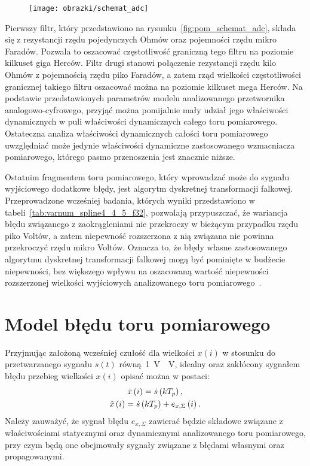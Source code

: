 \begin{figure}[htb!]
\begin{center}
\texttt{[image: obrazki/schemat\_adc]}
\end{center}
\end{figure}

Pierwszy filtr, który przedstawiono na rysunku~\ref{fig:pom_schemat_adc}, składa się z rezystancji rzędu pojedynczych Ohmów oraz pojemności rzędu mikro Faradów. Pozwala to oszacować częstotliwość graniczną tego filtru na poziomie kilkuset giga Herców. Filtr drugi stanowi połączenie rezystancji rzędu kilo Ohmów z pojemnością rzędu piko Faradów, a zatem rząd wielkości częstotliwości granicznej takiego filtru oszacować można na poziomie kilkuset mega Herców. Na podstawie przedstawionych parametrów modelu analizowanego przetwornika analogowo-cyfrowego, przyjąć można pomijalnie mały udział jego właściwości dynamicznych w puli właściwości dynamicznych całego toru pomiarowego. Ostateczna analiza właściwości dynamicznych całości toru pomiarowego uwzględniać może jedynie właściwości dynamiczne zastosowanego wzmacniacza pomiarowego, którego pasmo przenoszenia jest znacznie niższe.

Ostatnim fragmentem toru pomiarowego, który wprowadzać może do sygnału wyjściowego dodatkowe błędy, jest algorytm dyskretnej transformacji falkowej. Przeprowadzone wcześniej badania, których wyniki przedstawiono w tabeli~\ref{tab:varnum_spline4_4_5_f32}, pozwalają przypuszczać, że wariancja błędu związanego z zaokrągleniami nie przekroczy w bieżącym przypadku rzędu piko Voltów, a zatem niepewność rozszerzona z nią związana nie powinna przekroczyć rzędu mikro Voltów. Oznacza to, że błędy własne zastosowanego algorytmu dyskretnej transformacji falkowej mogą być pominięte w budżecie niepewności, bez większego wpływu na oszacowaną wartość niepewności rozszerzonej wielkości wyjściowych analizowanego toru pomiarowego~\cite{jcgm_guide}.

\section{Model błędu toru pomiarowego}

Przyjmując założoną wcześniej czułość dla wielkości $x(i)$ w stosunku do przetwarzanego sygnału $s(t)$ równą~\qty{1}{V \per V}, idealny oraz zakłócony sygnałem błędu przebieg wielkości $x(i)$ opisać można w postaci:
\begin{gather}
\dot{x} \left(i\right) = \dot{s} \left(kT_{p}\right) \label{eq:pom_dwtina_ideal}, \\
\tilde{x} \left(i\right) = \dot{s} \left(kT_{p}\right) + e_{x,\Sigma} \left(i\right) \label{eq:pom_dwtina_real}.
\end{gather}
Należy zauważyć, że sygnał błędu $e_{x,\Sigma}$ zawierać będzie składowe związane z właściwościami statycznymi oraz dynamicznymi analizowanego toru pomiarowego, przy czym będą one obejmowały sygnały związane z błędami własnymi oraz propagowanymi.

